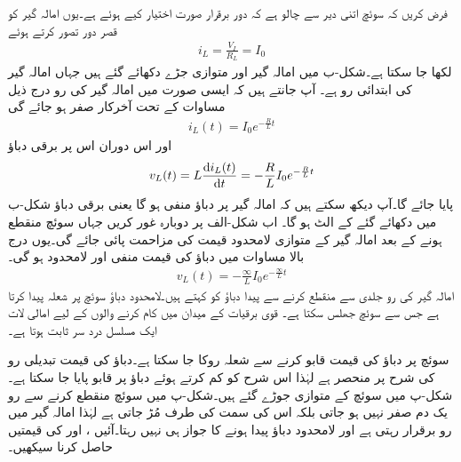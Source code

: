 فرض کریں کہ سوئچ اتنی دیر سے چالو ہے کہ دور برقرار صورت اختیار کیے ہوئے ہے۔یوں امالہ گیر کو قصر دور تصور کرتے ہوئے
\begin{align*}
i_L=\frac{V_I}{R_L}=I_0
\end{align*}
لکھا جا سکتا ہے۔شکل-ب میں  امالہ گیر اور  متوازی جڑے دکھائے گئے ہیں جہاں امالہ گیر کی ابتدائی رو  ہے۔ آپ جانتے ہیں کہ ایسی صورت میں امالہ گیر کی رو درج ذیل مساوات کے تحت آخرکار صفر ہو جائے گی
\begin{align*}
i_L(t)=I_0e^{-\frac{R}{L}t}
\end{align*} 
اور اس دوران اس پر برقی دباؤ
\begin{align*}
v_L(t)=L\frac{\dif i_L(t)}{\dif t}=-\frac{R}{L} I_0e^{-\frac{R}{L}t}
\end{align*}
پایا جائے گا۔آپ دیکھ سکتے ہیں کہ امالہ گیر پر دباؤ منفی ہو گا یعنی برقی دباؤ شکل-ب میں دکھائے گئے  کے الٹ ہو گا۔  اب شکل-الف پر دوبارہ غور کریں جہاں سوئچ منقطع ہونے کے بعد امالہ گیر کے متوازی لامحدود قیمت کی مزاحمت پائی جائے گی۔یوں درج بالا مساوات میں دباؤ کی قیمت منفی اور لامحدود ہو گی۔
\begin{align*}
v_L(t)=-\frac{\infty}{L} I_0e^{-\frac{\infty}{L}t}
\end{align*}
امالہ گیر کی رو جلدی سے منقطع کرنے سے پیدا دباؤ کو   کہتے ہیں۔لامحدود دباؤ سوئچ پر شعلہ پیدا کرتا ہے جس سے سوئچ جھلس سکتا ہے۔ قوی برقیات کے میدان میں کام کرنے والوں کے لیے امالی لات ایک مسلسل درد سر ثابت ہوتا ہے۔

سوئچ پر دباؤ کی قیمت قابو کرنے سے شعلہ روکا جا سکتا ہے۔دباؤ کی قیمت تبدیلی رو کی شرح پر منحصر ہے لہٰذا اس شرح کو کم کرتے ہوئے دباؤ پر قابو پایا جا سکتا ہے۔شکل-پ میں سوئچ کے متوازی  جوڑے گئے ہیں۔شکل-پ میں سوئچ منقطع کرنے سے رو یک دم صفر نہیں ہو جاتی بلکہ اس کی سمت  کی طرف مُڑ جاتی ہے لہٰذا امالہ گیر میں رو برقرار رہتی ہے اور لامحدود دباؤ پیدا ہونے کا جواز ہی نہیں رہتا۔آئیں ،  اور  کی قیمتیں حاصل کرنا سیکھیں۔

